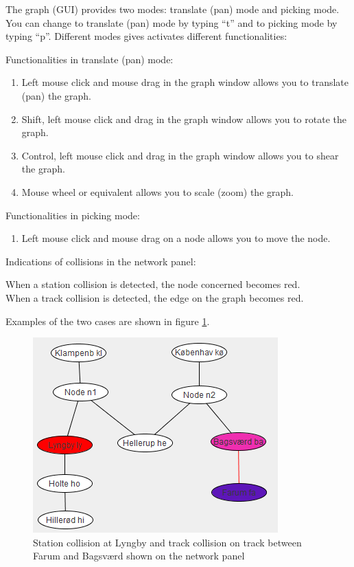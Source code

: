 \documentclass[10pt,a4paper]{article}
\begin{document}
The graph (GUI) provides two modes: translate (pan) mode and picking mode. You can change to translate (pan) mode by typing ``t'' and to picking mode by typing ``p''.
Different modes gives activates different functionalities:
 
Functionalities in translate (pan) mode:

\begin{enumerate}
  \item Left mouse click and mouse drag in the graph window allows you to translate (pan) the graph.
  \item Shift, left mouse click and drag in the graph window allows you to rotate the graph.
  \item Control, left mouse click and drag in the graph window allows you to shear the graph.
  \item Mouse wheel or equivalent allows you to scale (zoom) the graph.
\end{enumerate} 
Functionalities in picking mode:
 
\begin{enumerate}
  \item Left mouse click and mouse drag on a node allows you to move the node.
\end{enumerate}
 
Indications of collisions in the network panel:
 
When a station collision is detected, the node concerned becomes red.\\
When a track collision is detected, the edge on the graph becomes red.
 
Examples of the two cases are shown in figure \ref{fig:collision}.

\begin{figure}[h]
\centering
\includegraphics[scale=0.7]{fig/collision.png}
 \caption{Station collision at Lyngby and track collision on track between Farum and Bagsværd shown on the network panel}
 \label{fig:collision}
\end{figure}
 
\end{document}
